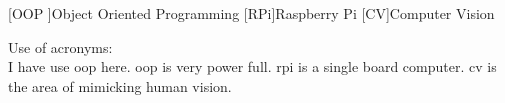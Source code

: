 \begin{acronym}
	[OOP ]{Object Oriented Programming }
	[RPi]{Raspberry Pi}
	[CV]{Computer Vision}
\end{acronym}

Use of acronyms:\\

I have use \ac{oop} here. \ac{oop} is very power full. \Ac{rpi} is a single board computer. \Ac{cv} is the area of mimicking human vision. 
